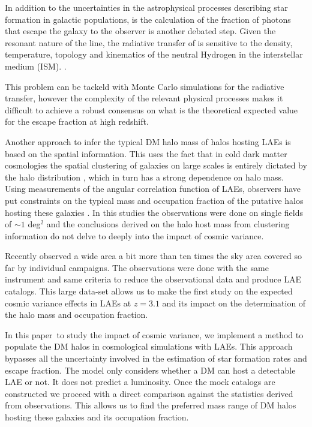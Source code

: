 \documentclass[usenatbib]{mn2e}
\newcommand{\documentname}{paper~}
\newcommand{\ly}{{\ifmmode{{\rm Ly}\alpha}\else{Ly$\alpha$~}\fi}}
\begin{document}
In addition to the uncertainties in the astrophysical processes
describing star formation in galactic populations, is the calculation
of the fraction of \ly photons that escape the galaxy to the observer
is another debated step. Given the resonant nature of the \ly line,
the radiative transfer of \ly is sensitive to the density,
temperature, topology and kinematics of the neutral Hydrogen in the
interstellar medium
(ISM). \citep{Neufeld1991,ForeroRomero2011,Dijkstra2012,Laursen2013,Orsi2012}.   

This problem can be tackeld with Monte Carlo simulations for the
radiative transfer, however the complexity of the relevant physical
processes makes it difficult to achieve a robust consensus on what is
the theoretical expected value for the \ly escape fraction
at high redshift. 

Another approach to infer the typical DM halo mass of halos hosting
LAEs is based on the spatial information. This uses the fact that in cold
dark matter cosmologies the spatial clustering of galaxies on large
scales is entirely dictated by the halo distribution
\citep{Colberg00}, which in turn has a strong dependence on halo
mass. Using measurements of the angular correlation function of LAEs,
observers have put constraints on the typical mass and occupation
fraction of the putative halos hosting these galaxies
\citep{Hayashino2004,Gawiser07,Nilsson2007,Ouchi2010}. In this
studies the observations were done on single fields of $\sim 1$
deg$^{2}$ and the conclusions derived on the halo host mass from
clustering information do not delve to deeply into the impact of
cosmic variance.

Recently \cite{Yamada2012} observed a wide area a bit more than ten
times the sky area covered so far by individual campaigns. The
observations were done with the same instrument and same criteria to
reduce the observational data and produce LAE catalogs. This large
data-set allows us to make the first study on the expected cosmic
variance effects in LAEs at $z=3.1$ and its impact on the
determination of the halo mass and occupation fraction. 


In this \documentname to study the impact of cosmic variance,
we implement a method to populate the DM halos in cosmological
simulations with LAEs. This approach bypasses all the uncertainty
involved in the estimation of star formation rates and \ly escape
fraction. The model only considers whether a DM can host a
detectable LAE or not. It does not predict a \ly  luminosity. Once the
mock catalogs are constructed  we proceed with a direct comparison
against the statistics derived from observations. This allows us 
to find the preferred mass range of DM halos hosting these galaxies
and its occupation fraction.
\end{document}
